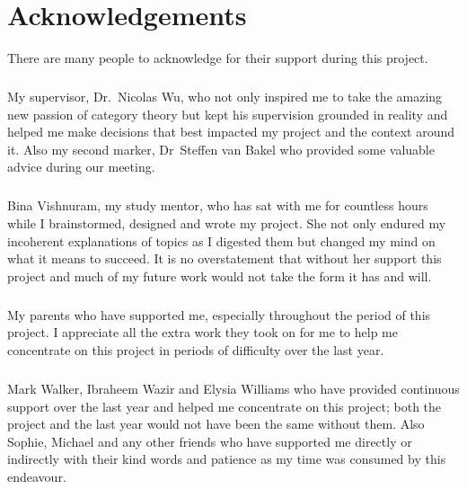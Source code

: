 \chapter*{Acknowledgements}
\begin{comment}
It is usual to thank those individuals who have provided particularly useful assistance, technical or otherwise, during your project. Your supervisor will obviously be pleased to be acknowledged as they will have invested quite a lot of time into overseeing your progress and supporting you.
\end{comment}
\begin{center}
There are many people to acknowledge for their support during this project.

\noindent
\paragraph{} My supervisor, Dr.~Nicolas Wu, who not only inspired me to take the
amazing new passion of category theory but kept his supervision grounded in
reality and helped me make decisions that best impacted my project and the
context around it. Also my second marker, Dr~Steffen van Bakel who provided some
valuable advice during our meeting.

\noindent
\paragraph{} Bina Vishnuram, my study mentor, who has sat with me for countless
hours while I brainstormed, designed and wrote my project. She not only endured
my incoherent explanations of topics as I digested them but changed my
mind on what it means to succeed. It is no
overstatement that without her support this project and much of my future work
would not take the form it has and will.

\noindent
\paragraph{} My parents who have supported me, especially throughout the period
of this project. I appreciate all the extra work they took on for me to help me
concentrate on this project in periods of difficulty over the last year.

\noindent
\paragraph{} Mark Walker, Ibraheem Wazir and Elysia Williams who have provided
continuous support over the last year and helped me concentrate on this project;
both the project and the last year would not have been the same without them.
Also Sophie, Michael and any other friends who have supported me directly or
indirectly with their kind words and patience as my time was consumed by this
endeavour.
\end{center}
